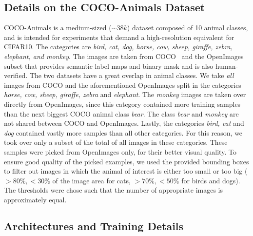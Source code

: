 \documentclass[10pt,twocolumn,letterpaper]{article}
\begin{document}
\subsection{Details on the COCO-Animals Dataset}

COCO-Animals is a medium-sized ($\sim 38k$) dataset composed of 10 animal classes, and is intended for experiments that demand a high-resolution equivalent for \mbox{CIFAR10}.
The categories are \textit{bird, cat, dog, horse, cow, sheep, giraffe, zebra, elephant, and monkey}. The images are taken from COCO~\cite{Lin2014MicrosoftCC} and the OpenImages~\cite{OpenImages} subset that provides semantic label maps and binary mask and is also human-verified. The two datasets have a great overlap in animal classes. We take \textit{all} images from COCO and the aforementioned OpenImages split in the categories \textit{horse, cow, sheep, giraffe, zebra} and \textit{elephant}. The \textit{monkey} images are taken over directly from OpenImages, since this category contained more training samples than the next biggest COCO animal class \textit{bear}. The class \textit{bear} and \textit{monkey} are not shared between COCO and OpenImages. Lastly, the categories \textit{bird, cat} and \textit{dog} contained vastly more samples than all other categories. For this reason, we took over only a subset of the total of all images in these categories. These samples were picked from OpenImages only, for their better visual quality. To ensure good quality of the picked examples, we used the provided bounding boxes to filter out images in which the animal of interest is either too small or too big ($>80\%,<30\%$ of the image area for cats, $>70\%,<50\%$ for birds and dogs). The thresholds were chose such that the number of appropriate images is approximately equal. 




 \subsection{Architectures and Training Details}\label{sec:networks}
\end{document}
